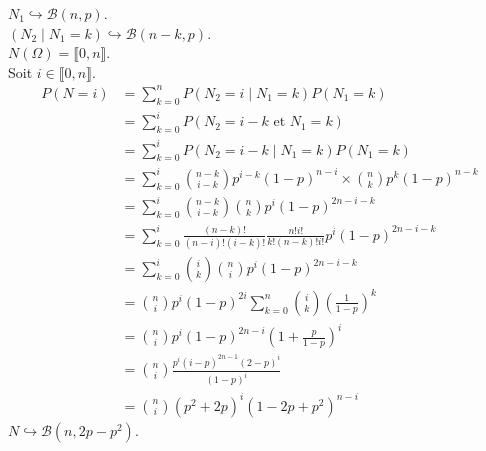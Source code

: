\documentclass[../main.tex]{subfiles}
\begin{document}
\noindent $N_1 \hookrightarrow \mathcal{B}(n, p)$. \\
$(N_2\mid N_1 = k) \hookrightarrow \mathcal{B}(n-k, p)$. \\
$N(\Omega) = \llbracket 0, n \rrbracket$. \\
Soit $i\in \llbracket 0, n \rrbracket$.
\begin{align*}
    P(N = i) &= \sum_{k=0}^{n} P(N_2 = i \mid N_1 = k)P(N_1 = k) \\
    &= \sum_{k=0}^{i} P(N_2 = i - k \text{ et } N_1 = k) \\
    &= \sum_{k=0}^{i} P(N_2 = i - k \mid N_1 = k)P(N_1 = k) \\
    &= \sum_{k=0}^{i} \binom{n-k}{i-k} p^{i-k} (1-p)^{n-i} \times \binom{n}{k} p^k (1-p)^{n-k} \\
    &= \sum_{k=0}^{i} \binom{n-k}{i-k} \binom{n}{k} p^i (1-p)^{2n-i-k} \\
    &= \sum_{k=0}^{i} \frac{(n-k)!}{(n-i)!(i-k)!} \frac{n!i!}{k!(n-k)!i!} p^i (1-p)^{2n-i-k} \\
    &= \sum_{k=0}^{i} \binom{i}{k}\binom{n}{i} p^i (1-p)^{2n-i-k} \\
    &= \binom{n}{i} p^i (1-p)^{2i} \sum_{k=0}^{n} \binom{i}{k} \left(\frac{1}{1-p}\right)^k \\
    &= \binom{n}{i} p^i (1-p)^{2n-i} \left(1 + \frac{p}{1-p}\right)^i \\
    &= \binom{n}{i} \frac{p^i (i-p)^{2n-1}(2-p)^i}{(1-p)^{i}} \\
    &= \binom{n}{i} (p^2 + 2p)^i (1 - 2p + p^2)^{n-i}
\end{align*}
$N\hookrightarrow \mathcal{B}(n, 2p-p^2)$.
\end{document}

